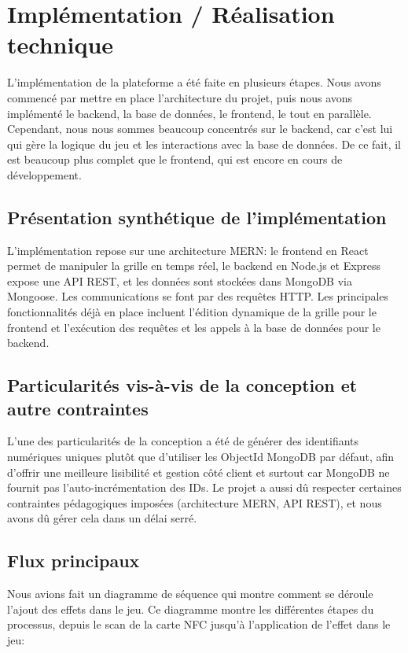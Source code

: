 \documentclass[12pt]{article}        %
\begin{document}
\newpage                            %

\section{Implémentation / Réalisation technique}
\label{sec:Implémentation}
L'implémentation de la plateforme a été faite en plusieurs étapes.
Nous avons commencé par mettre en place l'architecture du projet, 
puis nous avons implémenté le backend, la base de données, le frontend, 
le tout en parallèle. Cependant, nous nous sommes beaucoup concentrés 
sur le backend, car c'est lui qui gère la logique du jeu  et les 
interactions avec la base de données. De ce fait, il est beaucoup 
plus complet que le frontend, qui est encore en cours de développement.

\subsection{Présentation synthétique de l’implémentation}
\label{subsec:Présentation synthétique}
L’implémentation repose sur une architecture MERN: le frontend en React 
permet de manipuler la grille en temps réel, le backend en 
Node.js et Express expose une API REST, et les données sont stockées dans 
MongoDB via Mongoose. Les communications se font par des requêtes HTTP. 
Les principales fonctionnalités déjà en place incluent l’édition 
dynamique de la grille pour le frontend et l'exécution des requêtes
et les appels à la base de données pour le backend.

\subsection{Particularités vis-à-vis de la conception et autre 
contraintes}
\label{subsec:Particularités}
L’une des particularités de la conception a été de générer des
identifiants numériques uniques plutôt que d’utiliser les ObjectId 
MongoDB par défaut, afin d’offrir une meilleure lisibilité et gestion 
côté client et surtout car MongoDB ne fournit pas l'auto-incrémentation
des IDs. Le projet a aussi dû respecter certaines contraintes 
pédagogiques imposées (architecture MERN, API REST), et nous avons dû 
gérer cela dans un délai serré.

\subsection{Flux principaux}
\label{subsec:Flux principaux}
Nous avions fait un diagramme de séquence qui montre comment se déroule 
l'ajout des effets dans le jeu. Ce diagramme montre les différentes 
étapes du processus, depuis le scan de la carte NFC jusqu'à l'application 
de l'effet dans le jeu:
\end{document}
